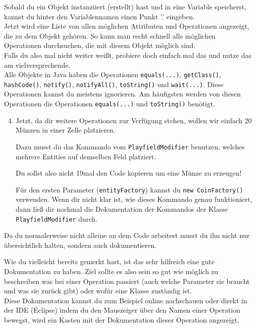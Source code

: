 \begin{Infobox}[Autocompletion]
    Sobald du ein Objekt instanziiert (erstellt) hast und in eine Variable speicherst, kannst du hinter den Variablennamen einen Punkt '.' eingeben.\\
    Jetzt wird eine Liste von allen möglichen Attributen und Operationen angezeigt, die zu dem Objekt gehören.
    So kann man recht schnell alle möglichen Operationen durchsuchen, die mit diesem Objekt möglich sind.\\
    Falls du also mal nicht weiter weißt, probiere doch einfach mal das und nutze das am vielversprechende.\\

    Alle Objekte in Java haben die Operationen \lstinline{equals(...)}, \lstinline{getClass()}, \lstinline{hashCode()}, \lstinline{notify()}, \lstinline{notifyAll()}, \lstinline{toString()} und \lstinline{wait(...)}.
    Diese Operationen kannst du meistens ignorieren.
    Am häufigsten werden von diesen Operationen die Operationen \lstinline{equals(...)} und \lstinline{toString()} benötigt.
\end{Infobox}

\begin{enumerate} \setcounter{enumi}{3}
    \item Jetzt, da dir weitere Operationen zur Verfügung stehen, wollen wir einfach 20 Münzen in einer Zelle platzieren.

        Dazu musst du das Kommando vom \lstinline{PlayfieldModifier} benutzen, welches mehrere Entities auf demselben Feld platziert.

        Du sollst also nicht 19mal den Code kopieren um eine Münze zu erzeugen!

        Für den ersten Parameter (\lstinline{entityFactory}) kannst du \lstinline{new CoinFactory()} verwenden.
        Wenn dir nicht klar ist, wie dieses Kommando genau funktioniert, dann ließ dir nochmal die Dokumentation der Kommandos der Klasse \lstinline{PlayfieldModifier} durch.
\end{enumerate}

\begin{Infobox}
    Da du normalerweise nicht alleine an dem Code arbeitest musst du ihn nicht nur übersichtlich halten, sondern auch dokumentieren.

    Wie du vielleicht bereits gemerkt hast, ist das sehr hilfreich eine gute Dokumentation zu haben.
    Ziel sollte es also sein so gut wie möglich zu beschreiben was bei einer Operation passiert (auch welche Parameter sie braucht und was sie zurück gibt) oder wofür eine Klasse zuständig ist.\\

    Diese Dokumentation kannst du zum Beispiel online nachschauen oder direkt in der IDE (Eclipse) indem du den Mauszeiger über den Namen einer Operation bewegst, wird ein Kasten mit der Dokumentation dieser Operation angezeigt.
\end{Infobox}


